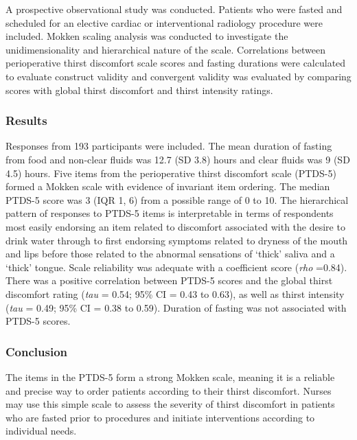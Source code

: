 \documentclass[letterpaper,9pt,twocolumn,twoside,]{pinp}
\begin{document}
A prospective observational study was conducted. Patients who were
fasted and scheduled for an elective cardiac or interventional radiology
procedure were included. Mokken scaling analysis was conducted to
investigate the unidimensionality and hierarchical nature of the scale.
Correlations between perioperative thirst discomfort scale scores and
fasting durations were calculated to evaluate construct validity and
convergent validity was evaluated by comparing scores with global thirst
discomfort and thirst intensity ratings.

\hypertarget{results}{%
\subsubsection{Results}\label{results}}

Responses from 193 participants were included. The mean duration of
fasting from food and non-clear fluids was 12.7 (SD 3.8) hours and clear
fluids was 9 (SD 4.5) hours. Five items from the perioperative thirst
discomfort scale (PTDS-5) formed a Mokken scale with evidence of
invariant item ordering. The median PTDS-5 score was 3 (IQR 1, 6) from a
possible range of 0 to 10. The hierarchical pattern of responses to
PTDS-5 items is interpretable in terms of respondents most easily
endorsing an item related to discomfort associated with the desire to
drink water through to first endorsing symptoms related to dryness of
the mouth and lips before those related to the abnormal sensations of
`thick' saliva and a `thick' tongue. Scale reliability was adequate with
a coefficient score (\emph{rho} =0.84). There was a positive correlation
between PTDS-5 scores and the global thirst discomfort rating
(\emph{tau} = 0.54; 95\% CI = 0.43 to 0.63), as well as thirst intensity
(\emph{tau} = 0.49; 95\% CI = 0.38 to 0.59). Duration of fasting was not
associated with PTDS-5 scores.

\hypertarget{conclusion}{%
\subsubsection{Conclusion}\label{conclusion}}

The items in the PTDS-5 form a strong Mokken scale, meaning it is a
reliable and precise way to order patients according to their thirst
discomfort. Nurses may use this simple scale to assess the severity of
thirst discomfort in patients who are fasted prior to procedures and
initiate interventions according to individual needs.
\end{document}
